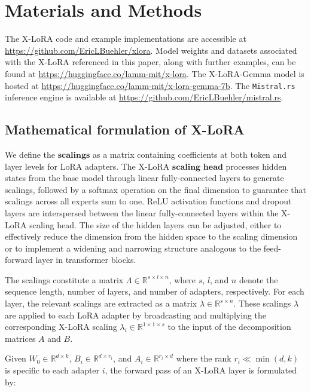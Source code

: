 \section{Materials and Methods}

The X-LoRA code and example implementations are accessible at \url{https://github.com/EricLBuehler/xlora}. Model weights and datasets associated with the X-LoRA referenced in this paper, along with further examples, can be found at \url{https://huggingface.co/lamm-mit/x-lora}. The X-LoRA-Gemma model is hosted at \url{https://huggingface.co/lamm-mit/x-lora-gemma-7b}. The \texttt{Mistral.rs} inference engine is available at \url{https://github.com/EricLBuehler/mistral.rs}.

\subsection{Mathematical formulation of X-LoRA} We define the $\mathbf{scalings}$ as a matrix containing coefficients at both token and layer levels for LoRA adapters. The X-LoRA $\mathbf{scaling}$ $\mathbf{head}$ processes hidden states from the base model through linear fully-connected layers to generate scalings, followed by a softmax operation on the final dimension to guarantee that scalings across all experts sum to one. ReLU activation functions and dropout layers are interspersed between the linear fully-connected layers within the X-LoRA scaling head. The size of the hidden layers can be adjusted, either to effectively reduce the dimension from the hidden space to the scaling dimension or to implement a widening and narrowing structure analogous to the feed-forward layer in transformer blocks.

The scalings constitute a matrix $\Lambda \in \mathbb{R}^{s \times l \times n}$, where $s$, $l$, and $n$ denote the sequence length, number of layers, and number of adapters, respectively. For each layer, the relevant scalings are extracted as a matrix $\lambda \in \mathbb{R}^{s \times n}$. These scalings $\lambda$ are applied to each LoRA adapter by broadcasting and multiplying the corresponding X-LoRA scaling $\lambda_i \in \mathbb{R}^{1 \times 1 \times s}$ to the input of the decomposition matrices $A$ and $B$.

Given $W_0 \in \mathbb{R}^{d \times k}$, $B_i \in \mathbb{R}^{d \times r_i}$, and $A_i \in \mathbb{R}^{r_i \times d}$ where the rank $r_i \ll \min(d,k)$ is specific to each adapter $i$, the forward pass of an X-LoRA layer is formulated by:

